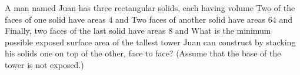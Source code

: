 A man named Juan has three rectangular solids, each having volume  Two of the faces of one solid have areas $4$ and  Two faces of another solid have areas $64$ and   Finally, two faces of the last solid have areas $8$ and  What is the minimum possible exposed surface area of the tallest tower Juan can construct by stacking his solids one on top of the other, face to face? (Assume that the base of the tower is not exposed.)